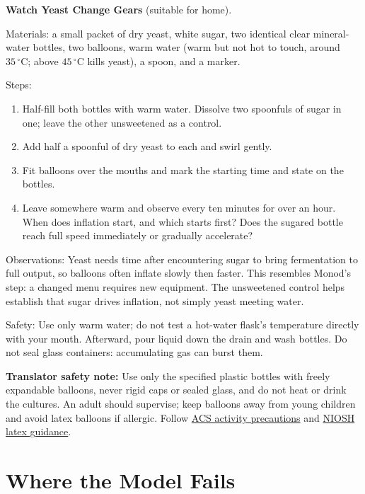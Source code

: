 \begin{shiyan}
\textbf{Watch Yeast Change Gears} (suitable for home).

Materials: a small packet of dry yeast, white sugar, two identical clear mineral-water bottles, two balloons, warm water (warm but not hot to touch, around $35\,^{\circ}\mathrm{C}$; above $45\,^{\circ}\mathrm{C}$ kills yeast), a spoon, and a marker.

Steps:
\begin{enumerate}[itemsep=1pt]
\item Half-fill both bottles with warm water. Dissolve two spoonfuls of sugar in one; leave the other unsweetened as a control.
\item Add half a spoonful of dry yeast to each and swirl gently.
\item Fit balloons over the mouths and mark the starting time and state on the bottles.
\item Leave somewhere warm and observe every ten minutes for over an hour. When does inflation start, and which starts first? Does the sugared bottle reach full speed immediately or gradually accelerate?
\end{enumerate}

Observations: Yeast needs time after encountering sugar to bring fermentation to full output, so balloons often inflate slowly then faster. This resembles Monod's step: a changed menu requires new equipment. The unsweetened control helps establish that sugar drives inflation, not simply yeast meeting water.

Safety: Use only warm water; do not test a hot-water flask's temperature directly with your mouth. Afterward, pour liquid down the drain and wash bottles. Do not seal glass containers: accumulating gas can burst them.
\end{shiyan}

\textbf{Translator safety note:} Use only the specified plastic bottles with freely expandable balloons, never rigid caps or sealed glass, and do not heat or drink the cultures. An adult should supervise; keep balloons away from young children and avoid latex balloons if allergic. Follow \href{https://www.acs.org/education/celebrating-chemistry-editions/2024-ccew/science-safety-tips.html}{ACS activity precautions} and \href{https://www.cdc.gov/niosh/docs/2012-119/default.html}{NIOSH latex guidance}.

\section{Where the Model Fails}

